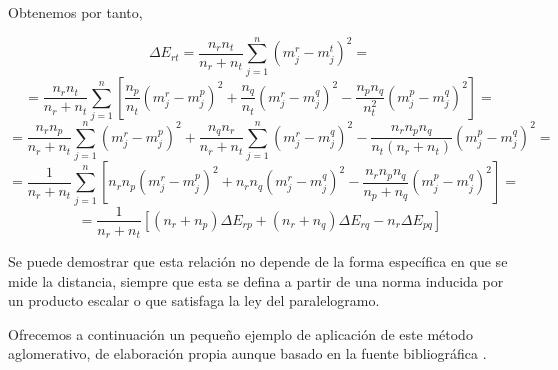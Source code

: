 Obtenemos por tanto,

\[
\Delta E_{rt} = \frac{n_{r}n_{t}}{n_{r}+n_{t}} \sum_{j=1}^{n} (m^{r}_{j}-m^{t}_{j})^{2} = 
\]
\[
= \frac{n_{r}n_{t}}{n_{r}+n_{t}}\sum_{j=1}^{n} \left[\frac{n_{p}}{n_{t}}(m^{r}_{j} - m^{p}_{j})^{2} + \frac{n_{q}}{n_{t}}(m^{r}_{j} - m^{q}_{j})^{2} - \frac{n_{p}n_{q}}{n_{t}^{2}}(m^{p}_{j}-m^{q}_{j})^{2}\right] = 
\]
\[
= \frac{n_{r}n_{p}}{n_{r}+n_{t}}\sum_{j=1}^{n} (m^{r}_{j} - m^{p}_{j})^{2} + \frac{n_{q}n_{r}}{n_{r}+n_{t}}\sum_{j=1}^{n}(m^{r}_{j} - m^{q}_{j})^{2} - \frac{n_{r}n_{p}n_{q}}{n_{t}(n_{r}+n_{t})}(m^{p}_{j}-m^{q}_{j})^{2} = 
\]
\[
= \frac{1}{n_{r}+n_{t}}\sum_{j=1}^{n}\left[n_{r}n_{p}(m^{r}_{j}-m^{p}_{j})^{2} + n_{r}n_{q}(m^{r}_{j}-m^{q}_{j})^{2} - \frac{n_{r}n_{p}n_{q}}{n_{p}+n_{q}}(m^{p}_{j}-m^{q}_{j})^{2}\right] =
\]
\[
= \frac{1}{n_{r}+n_{t}}[(n_{r}+n_{p})\Delta E_{rp} + (n_{r}+n_{q})\Delta E_{rq} - n_{r}\Delta E_{pq}]
\]

\vspace{0.5cm}

\begin{nota}
    Se puede demostrar que esta relación no depende de la forma específica en que se mide la distancia, siempre que esta se defina a partir de 
    una norma inducida por un producto escalar o que satisfaga la ley del paralelogramo.
\end{nota}

\vspace{0.5cm}

Ofrecemos a continuación un pequeño ejemplo de aplicación de este método aglomerativo, de elaboración propia aunque basado en la fuente bibliográfica \cite{bejar-AC}.

